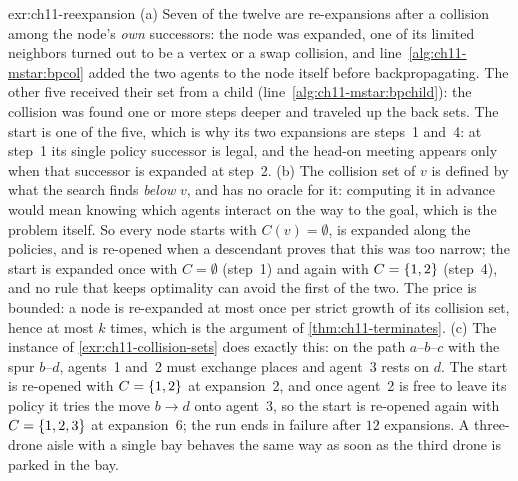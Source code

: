 \begin{solution}{exr:ch11-reexpansion}
(a) Seven of the twelve are re-expansions after a collision among the node's \emph{own} successors: the node was expanded, one of its limited neighbors turned out to be a vertex or a swap collision, and line~\ref{alg:ch11-mstar:bpcol} added the two agents to the node itself before backpropagating. The other five received their set from a child (line~\ref{alg:ch11-mstar:bpchild}): the collision was found one or more steps deeper and traveled up the back sets. The start is one of the five, which is why its two expansions are steps~1 and~4: at step~1 its single policy successor is legal, and the head-on meeting appears only when that successor is expanded at step~2. (b) The collision set of $v$ is defined by what the search finds \emph{below} $v$, and \mstar has no oracle for it: computing it in advance would mean knowing which agents interact on the way to the goal, which is the problem itself. So every node starts with $C(v) = \emptyset$, is expanded along the policies, and is re-opened when a descendant proves that this was too narrow; the start is expanded once with $C = \emptyset$ (step~1) and again with $C = \left\{ 1,2 \right\}$ (step~4), and no rule that keeps optimality can avoid the first of the two. The price is bounded: a node is re-expanded at most once per strict growth of its collision set, hence at most $k$ times, which is the argument of \cref{thm:ch11-terminates}. (c) The instance of \cref{exr:ch11-collision-sets} does exactly this: on the path $a$--$b$--$c$ with the spur $b$--$d$, agents~1 and~2 must exchange places and agent~3 rests on $d$. The start is re-opened with $C = \left\{ 1,2 \right\}$ at expansion~2, and once agent~2 is free to leave its policy it tries the move $b \to d$ onto agent~3, so the start is re-opened again with $C = \left\{ 1,2,3 \right\}$ at expansion~6; the run ends in failure after $12$ expansions. A three-drone aisle with a single bay behaves the same way as soon as the third drone is parked in the bay.
\end{solution}

